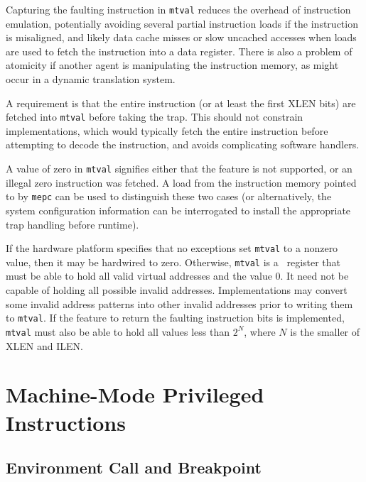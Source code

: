 \begin{commentary}
  Capturing the faulting instruction in {\tt mtval} reduces the
  overhead of instruction emulation, potentially avoiding several
  partial instruction loads if the instruction is misaligned, and
  likely data cache misses or slow uncached accesses when loads are
  used to fetch the instruction into a data register.  There is also a
  problem of atomicity if another agent is manipulating the
  instruction memory, as might occur in a dynamic translation system.

  A requirement is that the entire instruction (or at least the first
  XLEN bits) are fetched into {\tt mtval} before taking the trap.
  This should not constrain implementations, which would typically
  fetch the entire instruction before attempting to decode the
  instruction, and avoids complicating software handlers.

  A value of zero in {\tt mtval} signifies either that the feature is
  not supported, or an illegal zero instruction was fetched.  A load
  from the instruction memory pointed to by {\tt mepc} can be used to
  distinguish these two cases (or alternatively, the system
  configuration information can be interrogated to install the
  appropriate trap handling before runtime).
\end{commentary}

If the hardware platform specifies that no exceptions set {\tt mtval} to a
nonzero value, then it may be hardwired to zero.  Otherwise,
{\tt mtval} is a \warl\ register that must be able to hold all valid
virtual addresses and the value 0.  It need not be capable of holding all
possible invalid addresses.  Implementations may convert some invalid address
patterns into other invalid addresses prior to writing them to {\tt mtval}.
If the feature to return the faulting instruction bits is implemented, {\tt
mtval} must also be able to hold all values less than $2^N$, where $N$ is the
smaller of XLEN and ILEN.

\section{Machine-Mode Privileged Instructions}

\subsection{Environment Call and Breakpoint}

